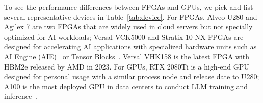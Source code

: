 To see the performance differences between FPGAs and GPUs, we pick and list several representative devices in Table~\ref{tab:device}.
For FPGAs, Alveo U280 and Agilex 7 are two FPGAs that are widely used in cloud servers but not specially optimized for AI workloads;
Versal VCK5000 and Stratix 10 NX FPGAs are designed for accelerating AI applications with specialized hardware units such as AI Engine (AIE)~\cite{xilinxAIE} or Tensor Blocks~\cite{stratix10}.
Versal VHK158 is the latest FPGA with HBM2e released by AMD in 2023.
For GPUs, RTX 2080Ti is a high-end GPU designed for personal usage with a similar process node and release date to U280;
A100 is the most deployed GPU in data centers to conduct LLM training and inference~\cite{openai2023gpt4}.

\begin{table}
    \centering
    \caption{Summary of FPGA and GPU devices.}
    \label{tab:device}
    \small
\end{table}
